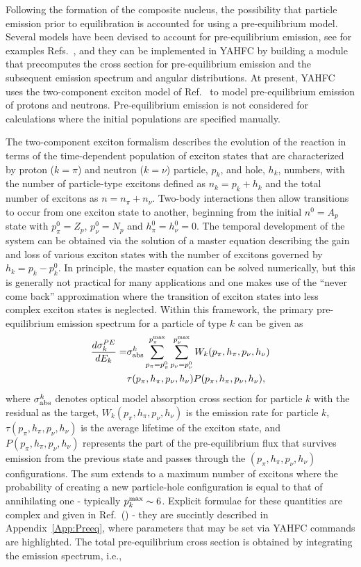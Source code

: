 \documentclass[
10pt,
showpacs,preprintnumbers,footinbib,
amsfonts,amsmath,amssymb,
aps,
prc,twocolumn,groupedaddress,superscriptaddress,
showkeys,
nofootinbib
]{revtex4-1}
\begin{document}
Following the formation of the composite nucleus, the possibility that particle emission prior to equilibration is accounted for using a pre-equilibrium model. Several models have been devised to account for pre-equilibrium emission, see for examples Refs.~\cite{Gadioli:1992,Blann:1996,Koning:2004},  and they can be implemented in YAHFC by building a module that precomputes the cross section for pre-equilibrium emission and the subsequent emission spectrum and angular distributions. At present, YAHFC uses the two-component exciton model of Ref.~\cite{Koning:2004} to model pre-equilibrium emission of protons and neutrons. Pre-equilibrium emission is not considered for calculations where the initial populations are specified manually.

The two-component exciton formalism describes the evolution of the reaction in terms of the time-dependent population of exciton states that are characterized by proton ($k=\pi$) and neutron ($k=\nu$) particle, $p_k$, and hole, $h_k$, numbers, with the number of particle-type excitons defined as  $n_k = p_k+ h_k$ and the total number of excitons as $n = n_\pi+n_\nu$.  Two-body interactions then allow transitions to occur from one exciton state to another, beginning from the initial $n^0=A_p$ state with $p^0_\pi= Z_p$, $p^0_\nu = N_p$ and $h^0_\pi = h^0_\nu = 0$. The temporal development of the system can be obtained via the solution of a master equation describing the gain and loss of various exciton states with the number of excitons governed by $h_k=p_k - p^0_k$. In principle, the master equation can be solved numerically, but this is generally not practical for many applications and one makes use of the ``never come back'' approximation where the transition of exciton states into less complex exciton states is neglected. Within this framework, the primary pre-equilibrium emission spectrum for a particle of type $k$ can be given as
\begin{align}
\frac{d\sigma_k^{PE}}{dE_k} = & \sigma_{\rm abs}^k \sum^{p^{\rm max}_\pi} _{p_\pi=p^0_\pi} \sum^{p^{\rm max}_\nu} _{p_\nu=p^0_\nu} W_k(p_\pi,h_\pi,p_\nu,h_\nu) \notag \\
 & \tau (p_\pi,h_\pi,p_\nu,h_\nu) P (p_\pi,h_\pi,p_\nu,h_\nu),
 \label{eq:PE-Spect}
\end{align}
where $\sigma_{\rm abs}^k$ denotes optical model absorption cross section for particle $k$ with the residual as the target, $W_k(p_\pi,h_\pi,p_\nu,h_\nu)$ is the emission rate for particle $k$, $\tau (p_\pi,h_\pi,p_\nu,h_\nu)$ is the average lifetime of the exciton state, and $P (p_\pi,h_\pi,p_\nu,h_\nu)$ represents the part of the pre-equilibrium flux that survives emission from the previous state and passes through the $(p_\pi,h_\pi,p_\nu,h_\nu)$ configurations. The sum extends to a maximum number of excitons where the probability of creating a new particle-hole configuration is equal to that of annihilating one - typically $p^{\rm max}_k \sim 6$. Explicit formulae for these quantities are complex and given in Ref.~(\cite{Koning:2004}) - they are succintly described in Appendix~\ref{App:Preeq}, where parameters that may be set via YAHFC commands are highlighted. The total pre-equilibrium cross section is obtained by integrating the emission spectrum, i.e.,
\end{document}
